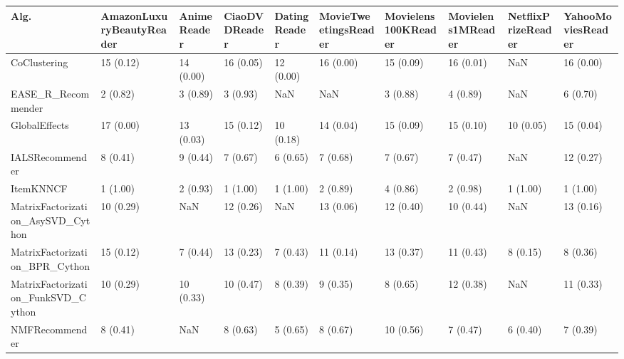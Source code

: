 \begin{tabular}{llllllllll}
\toprule
                               Alg. & AmazonLuxuryBeautyReader & AnimeReader & CiaoDVDReader & DatingReader & MovieTweetingsReader & Movielens100KReader & Movielens1MReader & NetflixPrizeReader & YahooMoviesReader \\
\midrule
                       CoClustering &                15 (0.12) &   14 (0.00) &     16 (0.05) &    12 (0.00) &            16 (0.00) &           15 (0.09) &         16 (0.01) &                NaN &         16 (0.00) \\
                 EASE\_R\_Recommender &                 2 (0.82) &    3 (0.89) &      3 (0.93) &          NaN &                  NaN &            3 (0.88) &          4 (0.89) &                NaN &          6 (0.70) \\
                      GlobalEffects &                17 (0.00) &   13 (0.03) &     15 (0.12) &    10 (0.18) &            14 (0.04) &           15 (0.09) &         15 (0.10) &          10 (0.05) &         15 (0.04) \\
                    IALSRecommender &                 8 (0.41) &    9 (0.44) &      7 (0.67) &     6 (0.65) &             7 (0.68) &            7 (0.67) &          7 (0.47) &                NaN &         12 (0.27) \\
                          ItemKNNCF &                 1 (1.00) &    2 (0.93) &      1 (1.00) &     1 (1.00) &             2 (0.89) &            4 (0.86) &          2 (0.98) &           1 (1.00) &          1 (1.00) \\
  MatrixFactorization\_AsySVD\_Cython &                10 (0.29) &         NaN &     12 (0.26) &          NaN &            13 (0.06) &           12 (0.40) &         10 (0.44) &                NaN &         13 (0.16) \\
     MatrixFactorization\_BPR\_Cython &                15 (0.12) &    7 (0.44) &     13 (0.23) &     7 (0.43) &            11 (0.14) &           13 (0.37) &         11 (0.43) &           8 (0.15) &          8 (0.36) \\
 MatrixFactorization\_FunkSVD\_Cython &                10 (0.29) &   10 (0.33) &     10 (0.47) &     8 (0.39) &             9 (0.35) &            8 (0.65) &         12 (0.38) &                NaN &         11 (0.33) \\
                     NMFRecommender &                 8 (0.41) &         NaN &      8 (0.63) &     5 (0.65) &             8 (0.67) &           10 (0.56) &          7 (0.47) &           6 (0.40) &          7 (0.39) \\

\end{tabular}
